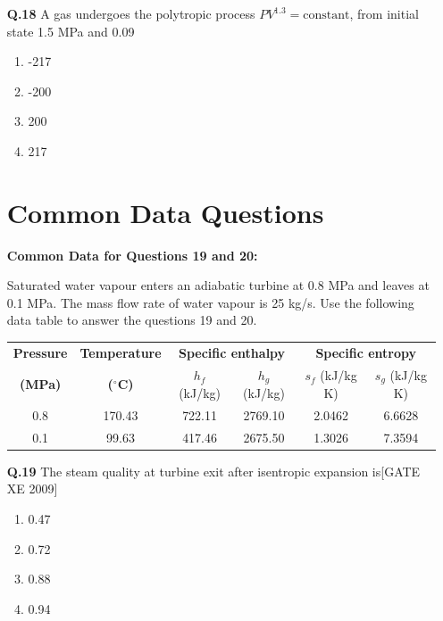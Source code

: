\documentclass[journal,12pt,onecolumn]{IEEEtran}
\theoremstyle{remark}
\begin{document}
\begin{enumerate}
\vspace{0.3cm}

\item[\textbf{Q.18}]A gas undergoes the polytropic process $PV^{1.3} = \text{constant}$, from initial state 1.5 MPa and 0.09 %
\begin{multicols}{2}
\begin{enumerate}
    \item -217
    \item -200
    \item 200
    \item 217
\end{enumerate}
\end{multicols}

\vspace{0.3cm}
\section*{Common Data Questions}

\textbf{Common Data for Questions 19 and 20:}

Saturated water vapour enters an adiabatic turbine at 0.8 MPa and leaves at 0.1 MPa. The mass flow rate of water vapour is 25 kg/s. Use the following data table to answer the questions 19 and 20.

\begin{table}[h!]
\centering
\begin{tabular}{|c|c|cc|cc|}
\hline
\textbf{Pressure} & \textbf{Temperature} & \multicolumn{2}{c|}{\textbf{Specific enthalpy}} & \multicolumn{2}{c|}{\textbf{Specific entropy}} \\ \cline{3-6}
\textbf{(MPa)} & \textbf{($^\circ$C)} & $h_f$ (kJ/kg) & $h_g$ (kJ/kg) & $s_f$ (kJ/kg K) & $s_g$ (kJ/kg K) \\ \hline
0.8 & 170.43 & 722.11 & 2769.10 & 2.0462 & 6.6628 \\ \hline
0.1 & 99.63 & 417.46 & 2675.50 & 1.3026 & 7.3594 \\ \hline
\end{tabular}
\end{table}



\item[\textbf{Q.19}]The steam quality at turbine exit after isentropic expansion is\hfill[GATE XE 2009]
\begin{multicols}{2}
\begin{enumerate}
    \item 0.47
    \item 0.72
    \item 0.88
    \item 0.94
\end{enumerate}
\end{multicols}


\end{enumerate}
\end{document}
